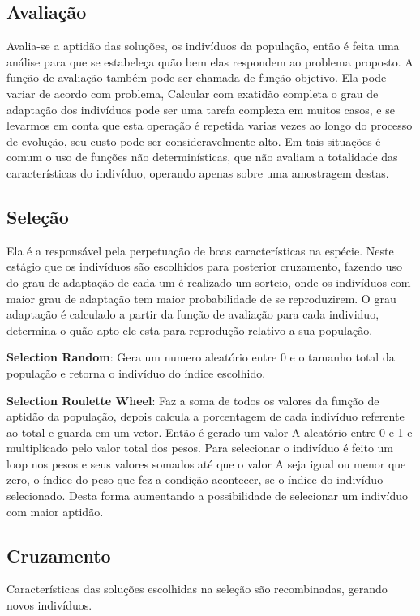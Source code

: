 \subsection{Avaliação}
Avalia-se a aptidão das soluções, os indivíduos da população, então é feita uma análise para que se estabeleça quão bem elas respondem ao problema proposto.
A função de avaliação também pode ser chamada de função objetivo. Ela pode variar de acordo com problema,  
Calcular com exatidão completa o grau de adaptação dos indivíduos pode ser uma tarefa complexa em muitos casos, e se levarmos em conta que esta operação é repetida varias vezes ao longo do processo de evolução, seu custo pode ser consideravelmente alto. Em tais situações é comum o uso de funções não determinísticas, que não avaliam a totalidade das características do indivíduo, operando apenas sobre uma amostragem destas.

\subsection{Seleção}
Ela é a responsável pela perpetuação de boas características na espécie. 
Neste estágio que os indivíduos são escolhidos para posterior cruzamento, fazendo uso do grau de adaptação de cada um é realizado um sorteio, onde os indivíduos com maior grau de adaptação tem maior probabilidade de se reproduzirem.
O grau adaptação é calculado a partir da função de avaliação para cada individuo, determina o quão apto ele esta para reprodução relativo a sua população. 

\textbf{Selection Random}: Gera um numero aleatório entre 0 e o tamanho total da população e retorna o indivíduo do índice escolhido.

\textbf{Selection Roulette Wheel}: Faz a soma de todos os valores da função de aptidão da população, depois calcula a porcentagem de cada indivíduo referente ao total 
e guarda em um vetor. Então é gerado um valor A aleatório entre 0 e 1 e multiplicado pelo valor total dos pesos. Para selecionar o indivíduo é feito um loop 
nos pesos e seus valores somados até que o valor A seja igual ou menor que zero, o índice do peso que fez a condição acontecer, se o índice do indivíduo selecionado.
Desta forma aumentando a possibilidade de selecionar um indivíduo com maior aptidão.

\subsection{Cruzamento}
Características das soluções escolhidas na seleção são recombinadas, gerando novos indivíduos.

